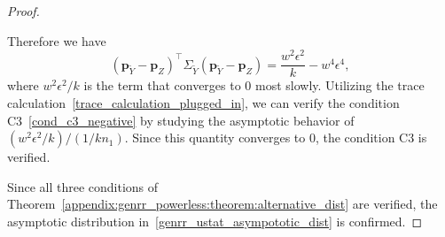 \documentclass[twoside,11pt]{article}
\newcommand{\rvTwo}{Y}
\newcommand{\rvThree}{Z}
\newcommand{\alphabetSize}{k} %
\newcommand{\sampleSize}{n}
\newcommand{\probVec}{\mathbf{p}} %
\begin{document}
\begin{appendix}
\begin{proof}
\begin{itemize}
			Therefore we have
			\begin{equation}\label{noise_calculation_done}
				(\probVec_{\tilde{\rvTwo}} - \probVec_\rvThree)^\top 
				\Sigma_{
					\tilde{
						{\rvTwo}
					}
				}
				(\probVec_{\tilde{\rvTwo}} - \probVec_\rvThree)
				=
				\frac{w^2 \epsilon^2}{\alphabetSize}
				-
				w^4 \epsilon^4,
			\end{equation}
			where $w^2 \epsilon^2 / \alphabetSize$ is the term that converges to 0 most slowly. 
			Utilizing the trace calculation~\eqref{trace_calculation_plugged_in}, we can verify the condition C3~\eqref{cond_c3_negative}
			by studying the asymptotic behavior of $(w^2 \epsilon^2 / \alphabetSize)/(1/\alphabetSize \sampleSize_1)$. Since this quantity converges to 0, the condition C3  is verified.
		\end{itemize}
		Since all three conditions of Theorem~\ref{appendix:genrr_powerless:theorem:alternative_dist} are verified,  the asymptotic distribution in~\eqref{genrr_ustat_asympototic_dist} is confirmed.
		

\end{proof}
\end{appendix}
\end{document}
